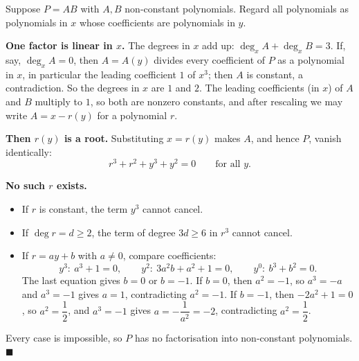 Suppose $P=AB$ with $A,B$ non-constant polynomials. Regard all polynomials as polynomials in $x$ whose coefficients are polynomials in $y$.

\textbf{One factor is linear in $x$.} The degrees in $x$ add up: $\deg_xA+\deg_xB=3$. If, say, $\deg_xA=0$, then $A=A(y)$ divides every coefficient of $P$ as a polynomial in $x$, in particular the leading coefficient $1$ of $x^3$; then $A$ is constant, a contradiction. So the degrees in $x$ are $1$ and $2$. The leading coefficients (in $x$) of $A$ and $B$ multiply to $1$, so both are nonzero constants, and after rescaling we may write $A=x-r(y)$ for a polynomial $r$.

\textbf{Then $r(y)$ is a root.} Substituting $x=r(y)$ makes $A$, and hence $P$, vanish identically:
\[
r^3+r^2+y^3+y^2=0\qquad\text{for all }y .
\]

\textbf{No such $r$ exists.}
\begin{itemize}
\item If $r$ is constant, the term $y^3$ cannot cancel.
\item If $\deg r=d\ge2$, the term of degree $3d\ge6$ in $r^3$ cannot cancel.
\item If $r=ay+b$ with $a\ne0$, compare coefficients:
\[
y^3:\ a^3+1=0,\qquad y^2:\ 3a^2b+a^2+1=0,\qquad y^0:\ b^3+b^2=0 .
\]
The last equation gives $b=0$ or $b=-1$. If $b=0$, then $a^2=-1$, so $a^3=-a$ and $a^3=-1$ gives $a=1$, contradicting $a^2=-1$. If $b=-1$, then $-2a^2+1=0$, so $a^2=\dfrac{1}{2}$, and $a^3=-1$ gives $a=-\dfrac{1}{a^2}=-2$, contradicting $a^2=\dfrac{1}{2}$.
\end{itemize}
Every case is impossible, so $P$ has no factorisation into non-constant polynomials. $\blacksquare$
